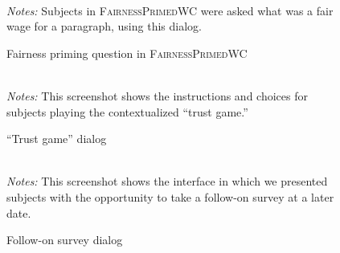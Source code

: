\documentclass[11pt]{article}
\begin{document}
\begin{figure}
  \caption{Fairness priming question in \textsc{FairnessPrimedWC} \label{fig:priming}}
\centering
\begin{minipage}{0.85\linewidth}
\\
\footnotesize 
\emph{Notes:} Subjects in \textsc{FairnessPrimedWC} were asked what was a fair wage for a
paragraph, using this dialog.  
\end{minipage}
\end{figure}

\begin{figure}
  \caption{``Trust game'' dialog \label{fig:trust}}
\centering
\begin{minipage}{0.85\linewidth}
\\
\footnotesize \emph{Notes:} This screenshot shows the instructions and
choices for subjects playing the contextualized ``trust game.''  
\end{minipage}
\end{figure}


\begin{figure}
  \caption{Follow-on survey dialog \label{fig:follow_on_survey}}
\centering
\begin{minipage}{0.85\linewidth}
\\
\footnotesize \emph{Notes:} This screenshot shows the interface in
which we presented subjects with the opportunity to take a follow-on
survey at a later date.   
\end{minipage}
\end{figure}
\end{document}
